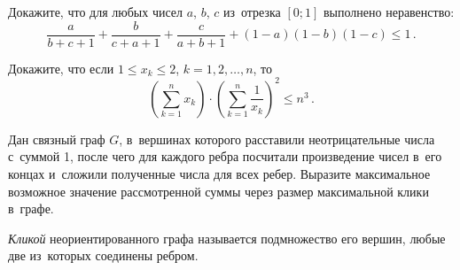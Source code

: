 \begin{problems}
\item
Докажите, что для любых чисел $a$, $b$, $c$ из~отрезка $[0; 1]$ выполнено
неравенство:
\[
    \frac{a}{b + c + 1} + \frac{b}{c + a + 1} + \frac{c}{a + b + 1} +
    (1 - a) (1 - b) (1 - c)
\leq
    1
\, . \]

\item
Докажите, что если $1 \leq x_{k} \leq 2$, $k = 1, 2, \ldots, n$, то%
\[
    \left(
        \sum_{k=1}^{n}
            x_{k}
    \right)
    \cdot
    \left(
        \sum_{k=1}^{n}
            \frac{1}{x_{k}}
    \right)^2
\leq
    n^3
\, . \]



\item
Дан связный граф $G$, в~вершинах которого расставили неотрицательные числа
с~суммой 1, после чего для каждого ребра посчитали произведение чисел в~его
концах и~сложили полученные числа для всех ребер.
Выразите максимальное возможное значение рассмотренной суммы через размер
максимальной клики в~графе.
\par
\emph{Кликой} неориентированного графа называется подмножество его вершин,
любые две из~которых соединены ребром.


\end{problems}



